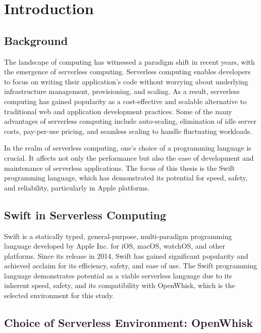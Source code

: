\chapter{Introduction}
\etocsettocstyle{\rule{\textwidth}{1pt}}{\rule{\textwidth}{1pt}} %
\localtableofcontents
\section{Background}

The landscape of computing has witnessed a paradigm shift in recent years, with the emergence of serverless computing. Serverless computing enables developers to focus on writing their application's code without worrying about underlying infrastructure management, provisioning, and scaling. As a result, serverless computing has gained popularity as a cost-effective and scalable alternative to traditional web and application development practices. Some of the many advantages of serverless computing include auto-scaling, elimination of idle server costs, pay-per-use pricing, and seamless scaling to handle fluctuating workloads.

In the realm of serverless computing, one's choice of a programming language is crucial. It affects not only the performance but also the ease of development and maintenance of serverless applications. The focus of this thesis is the Swift programming language, which has demonstrated its potential for speed, safety, and reliability, particularly in Apple platforms.

\section{Swift in Serverless Computing}

Swift is a statically typed, general-purpose, multi-paradigm programming language developed by Apple Inc. for iOS, macOS, watchOS, and other platforms. Since its release in 2014, Swift has gained significant popularity and achieved acclaim for its efficiency, safety, and ease of use. The Swift programming language demonstrates potential as a viable serverless language due to its inherent speed, safety, and its compatibility with OpenWhisk, which is the selected environment for this study.

\section{Choice of Serverless Environment: OpenWhisk}

